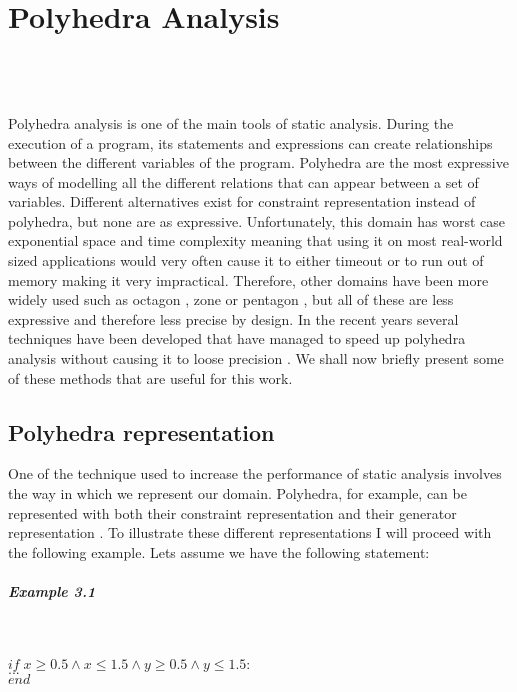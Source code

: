 
\chapter{Polyhedra Analysis}
\mbox{}\\
\mbox{}\\
\mbox{}\\
Polyhedra analysis is one of the main tools of static analysis\cite{cousot1977abstract}. During the execution of a program, its statements and expressions can create relationships between the different variables of the program. Polyhedra are the most expressive ways of modelling all the different relations that can appear between a set of variables. Different alternatives exist for constraint representation instead of polyhedra, but none are as expressive. Unfortunately, this domain has worst case exponential space and time complexity meaning that using it on most real-world sized applications would very often cause it to either timeout or to run out of memory making it very impractical. Therefore, other domains have been more widely used such as octagon \cite{mine2006octagon}, zone \cite{mine2001new} or pentagon \cite{logozzo2010pentagons} , but all of these are less expressive and therefore less precise by design. In the recent years several techniques have been developed that have managed to speed up polyhedra analysis without causing it to loose precision \cite{gange2016exploiting,jourdan2017sparsity,marechal2017efficient}. We shall now briefly present some of these methods that are useful for this work.

\section{Polyhedra representation}
One of the technique used to increase the performance of static analysis involves the way in which we represent our domain\cite{singh2015making}. Polyhedra, for example, can be represented with both their constraint representation and their generator representation\cite{motzkin1953double} . To illustrate these different representations I will proceed with the following example. Lets assume we have the following statement:
\paragraph{Example 3.1}\mbox{}\\
\begin{center}
	$if \; x\geq0.5\wedge x\leq 1.5 \wedge y\geq 0.5 \wedge y \leq1.5: $\\
	$...\;\;\;\;\;$\\
	$end \qquad\qquad\qquad\qquad\qquad\qquad\qquad\qquad$
\end{center}

